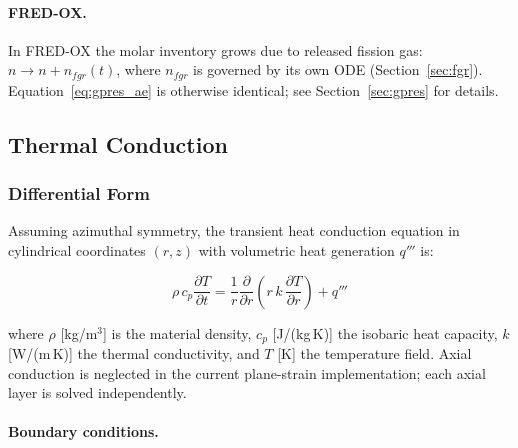 \begin{refsection}
\paragraph{FRED-OX.} In FRED-OX the molar inventory grows due to released fission gas: $n \to n + n_{fgr}(t)$, where $n_{fgr}$ is governed by its own ODE (Section~\ref{sec:fgr}).  Equation~\eqref{eq:gpres_ae} is otherwise identical; see Section~\ref{sec:gpres} for details.

\subsection{Thermal Conduction}
\label{sec:heat}

\subsubsection{Differential Form}

Assuming azimuthal symmetry, the transient heat conduction equation in cylindrical coordinates $(r,z)$ with volumetric heat generation $q'''$ is:

\begin{equation}
  \rho\, c_p \frac{\partial T}{\partial t}
  = \frac{1}{r}\frac{\partial}{\partial r}
    \!\left(r\,k\,\frac{\partial T}{\partial r}\right) + q'''
  \label{eq:heat_pde}
\end{equation}

where $\rho$ [kg/m$^3$] is the material density, $c_p$ [J/(kg\,K)] the isobaric heat capacity, $k$ [W/(m\,K)] the thermal conductivity, and $T$ [K] the temperature field.  Axial conduction is neglected in the current plane-strain implementation; each axial layer is solved independently.

\paragraph{Boundary conditions.}


\end{refsection}
